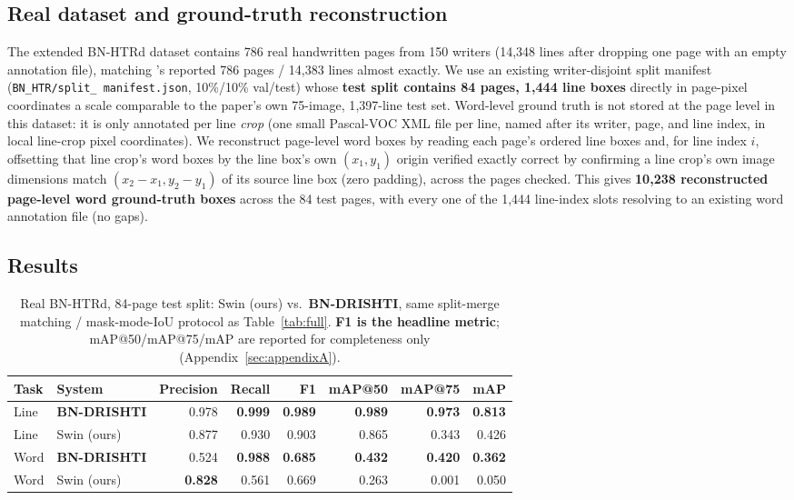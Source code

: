 \documentclass[11pt]{article}
\newcommand{\bnd}{\textbf{BN-DRISHTI}}
\begin{document}
\subsection{Real dataset and ground-truth reconstruction}

The extended BN-HTRd dataset contains 786 real handwritten pages from 150 writers
(14{,}348 lines after dropping one page with an empty annotation file), matching
\cite{jubaer2023bndrishti}'s reported 786 pages / 14{,}383 lines almost exactly. We use
an existing writer-disjoint split manifest (\texttt{BN\_HTR/split\_\allowbreak
manifest.json}, 10\%/10\% val/test) whose \textbf{test split contains 84 pages,
1{,}444 line boxes} directly in
page-pixel coordinates \textemdash{} a scale comparable to the paper's own 75-image,
1{,}397-line test set. Word-level ground truth is not stored at the page level in this
dataset: it is only annotated per line \emph{crop} (one small Pascal-VOC XML file per
line, named after its writer, page, and line index, in local line-crop pixel
coordinates). We reconstruct page-level word boxes by reading each page's ordered line
boxes and, for line index $i$, offsetting that line crop's word boxes by the line box's
own $(x_1, y_1)$ origin \textemdash{} verified exactly correct by confirming a line
crop's own image dimensions match $(x_2-x_1, y_2-y_1)$ of its source line box (zero
padding), across the pages checked. This gives \textbf{10{,}238 reconstructed
page-level word ground-truth boxes} across the 84 test pages, with every one of the
1{,}444 line-index slots resolving to an existing word annotation file (no gaps).

\subsection{Results}

\begin{table}[H]
\centering
\caption{Real BN-HTRd, 84-page test split: Swin (ours) vs.\ \bnd{}, same split-merge
matching / mask-mode-IoU protocol as Table~\ref{tab:full}. \textbf{F1 is the headline
metric}; mAP@50/mAP@75/mAP are reported for completeness only
(Appendix~\ref{sec:appendixA}).}
\label{tab:real}
\begin{tabular}{@{}llrrrrrr@{}}
\toprule
Task & System & Precision & Recall & F1 & mAP@50 & mAP@75 & mAP \\
\midrule
Line & \textbf{\bnd{}} & 0.978 & \textbf{0.999} & \textbf{0.989} & \textbf{0.989} & \textbf{0.973} & \textbf{0.813} \\
Line & Swin (ours) & 0.877 & 0.930 & 0.903 & 0.865 & 0.343 & 0.426 \\
Word & \bnd{}     & 0.524 & \textbf{0.988} & \textbf{0.685} & \textbf{0.432} & \textbf{0.420} & \textbf{0.362} \\
Word & Swin (ours) & \textbf{0.828} & 0.561 & 0.669 & 0.263 & 0.001 & 0.050 \\
\bottomrule
\end{tabular}
\end{table}
\end{document}
